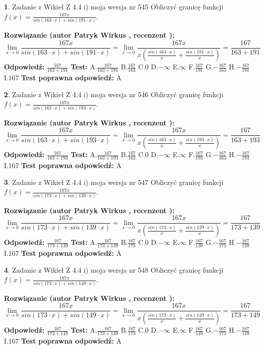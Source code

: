 \documentclass[12pt, a4paper]{article}
\theoremstyle{definition} %
\newtheorem{zad}{}
\newcommand{\zadStart}[1]{\begin{zad}#1\newline}
\newcommand{\zadStop}{\end{zad}}
\newcommand{\rozwStart}[2]{\noindent \textbf{Rozwiązanie (autor #1 , recenzent #2): }\newline}
\newcommand{\rozwStop}{\newline}
\newcommand{\odpStart}{\noindent \textbf{Odpowiedź:}\newline}
\newcommand{\odpStop}{\newline}
\newcommand{\testStart}{\noindent \textbf{Test:}\newline}
\newcommand{\testStop}{\newline}
\newcommand{\kluczStart}{\noindent \textbf{Test poprawna odpowiedź:}\newline}
\newcommand{\kluczStop}{\newline}
\begin{document}
\zadStart{Zadanie z Wikieł Z 4.4 i) moja wersja nr 545}
Obliczyć granicę funkcji $f(x)=\frac{167x}{sin(163\cdot x) +sin(191\cdot x)}$.
\zadStop
\rozwStart{Patryk Wirkus}{}
$$\lim\limits_{x\to 0}\frac{167x}{sin(163\cdot x) +sin(191\cdot x)}=\lim\limits_{x\to 0}\frac{167x}{x(\frac{sin(163\cdot x)}{x}+\frac{sin(191\cdot x)}{x})}=\frac{167}{163+191}$$
\rozwStop
\odpStart
$\frac{167}{163+191}$
\odpStop
\testStart
A.$\frac{167}{163+191}$
B.$\frac{167}{163}$
C.$0$
D.$-\infty$
E.$\infty$
F.$\frac{167}{191}$
G.$-\frac{167}{163}$
H.$-\frac{167}{191}$
I.$167$
\testStop
\kluczStart
A
\kluczStop



\zadStart{Zadanie z Wikieł Z 4.4 i) moja wersja nr 546}
Obliczyć granicę funkcji $f(x)=\frac{167x}{sin(163\cdot x) +sin(193\cdot x)}$.
\zadStop
\rozwStart{Patryk Wirkus}{}
$$\lim\limits_{x\to 0}\frac{167x}{sin(163\cdot x) +sin(193\cdot x)}=\lim\limits_{x\to 0}\frac{167x}{x(\frac{sin(163\cdot x)}{x}+\frac{sin(193\cdot x)}{x})}=\frac{167}{163+193}$$
\rozwStop
\odpStart
$\frac{167}{163+193}$
\odpStop
\testStart
A.$\frac{167}{163+193}$
B.$\frac{167}{163}$
C.$0$
D.$-\infty$
E.$\infty$
F.$\frac{167}{193}$
G.$-\frac{167}{163}$
H.$-\frac{167}{193}$
I.$167$
\testStop
\kluczStart
A
\kluczStop



\zadStart{Zadanie z Wikieł Z 4.4 i) moja wersja nr 547}
Obliczyć granicę funkcji $f(x)=\frac{167x}{sin(173\cdot x) +sin(139\cdot x)}$.
\zadStop
\rozwStart{Patryk Wirkus}{}
$$\lim\limits_{x\to 0}\frac{167x}{sin(173\cdot x) +sin(139\cdot x)}=\lim\limits_{x\to 0}\frac{167x}{x(\frac{sin(173\cdot x)}{x}+\frac{sin(139\cdot x)}{x})}=\frac{167}{173+139}$$
\rozwStop
\odpStart
$\frac{167}{173+139}$
\odpStop
\testStart
A.$\frac{167}{173+139}$
B.$\frac{167}{173}$
C.$0$
D.$-\infty$
E.$\infty$
F.$\frac{167}{139}$
G.$-\frac{167}{173}$
H.$-\frac{167}{139}$
I.$167$
\testStop
\kluczStart
A
\kluczStop



\zadStart{Zadanie z Wikieł Z 4.4 i) moja wersja nr 548}
Obliczyć granicę funkcji $f(x)=\frac{167x}{sin(173\cdot x) +sin(149\cdot x)}$.
\zadStop
\rozwStart{Patryk Wirkus}{}
$$\lim\limits_{x\to 0}\frac{167x}{sin(173\cdot x) +sin(149\cdot x)}=\lim\limits_{x\to 0}\frac{167x}{x(\frac{sin(173\cdot x)}{x}+\frac{sin(149\cdot x)}{x})}=\frac{167}{173+149}$$
\rozwStop
\odpStart
$\frac{167}{173+149}$
\odpStop
\testStart
A.$\frac{167}{173+149}$
B.$\frac{167}{173}$
C.$0$
D.$-\infty$
E.$\infty$
F.$\frac{167}{149}$
G.$-\frac{167}{173}$
H.$-\frac{167}{149}$
I.$167$
\testStop
\kluczStart
A
\kluczStop
\end{document}
